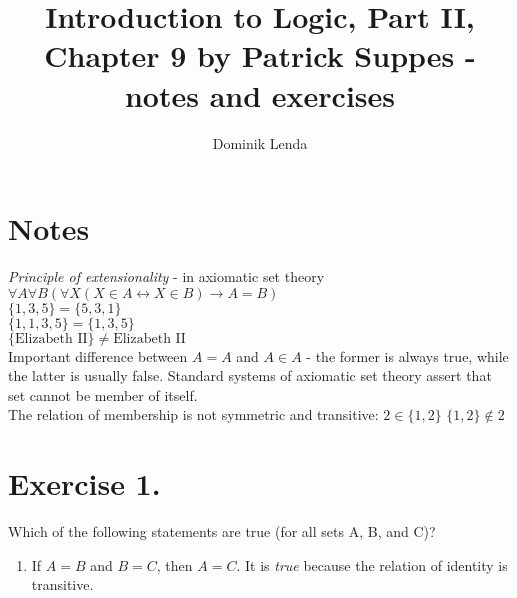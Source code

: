 \documentclass{article}
\title{Introduction to Logic, Part II, Chapter 9 by Patrick Suppes - notes and exercises}
\author{Dominik Lenda}
\begin{document}
\maketitle

\section{Notes}
\emph{Principle of extensionality} - in axiomatic set theory\\
\smallskip
$\forall A \forall B (\forall X (X \in A \leftrightarrow X \in B) \rightarrow A = B)$\\
\smallskip
$\{1, 3, 5\} = \{5, 3, 1\}$\\
\smallskip
$\{1, 1, 3, 5\} = \{1, 3, 5\}$\\
\smallskip
$\{\text{Elizabeth II}\} \neq \text{Elizabeth II}$\\
Important difference between $A = A$ and $A \in A$ - the former is always true, while the latter is usually false. Standard systems of axiomatic set theory assert that set cannot be member of itself.\\
The relation of membership is not symmetric and transitive:
$2 \in \{1, 2\}$
$\{1, 2\} \notin 2$
\smallskip

\section*{Exercise 1.}
Which of the following statements are true (for all sets A, B, and C)?
\singlespace
\begin{enumerate}[label=(\alph*)]
\item If \(A = B\) and \(B = C\), then \(A = C\).
It is \emph{true} because the relation of identity is transitive.
\end{enumerate}
\end{document}
